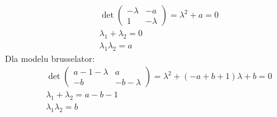 \documentclass[10pt, a4paper, twoside, onecolumn]{article}
\numberwithin{equation}{section}
\begin{document}
	\begin{gather}
		\det
		\begin{pmatrix}
			-\lambda & -a \\
			1 & -\lambda
		\end{pmatrix}
		=\lambda^{2}+a=0 \\
		\lambda_{1}+\lambda_{2}=0 \\
		\lambda_{1}\lambda_{2}=a
	\end{gather}
	Dla modelu brusselator:
	\begin{gather}
		\det
		\begin{pmatrix}
			a-1-\lambda & a \\
			-b & -b-\lambda
		\end{pmatrix}
		=\lambda^{2}+(-a+b+1)\lambda+b=0 \\
		\lambda_{1}+\lambda_{2}=a-b-1 \\
		\lambda_{1}\lambda_{2}=b
	\end{gather}
\end{document}
